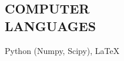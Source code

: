 \documentclass[margin]{res} %
\begin{document}
\begin{resume}
\section{COMPUTER \\ LANGUAGES}
Python (Numpy, Scipy), \LaTeX

\end{resume}
\end{document}
